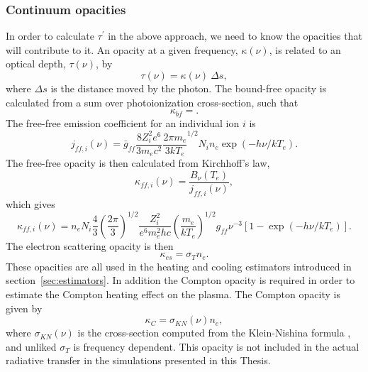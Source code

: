 \subsubsection{Continuum opacities}

In order to calculate $\tau^\prime$ in the above approach, we need
to know the opacities that will contribute to it. An opacity 
at a given frequency, $\kappa(\nu)$,
is related to an optical depth, $\tau(\nu)$, by
\begin{equation}
\tau(\nu) = \kappa(\nu)~\Delta s,
\end{equation}
where $\Delta s$ is the distance moved by the photon. The bound-free
opacity is calculated from a sum over photoionization cross-section,
such that
\begin{equation}
\kappa_{bf} = .
\end{equation}
The free-free emission coefficient for an individual ion $i$ is \citep{gayet1970}
\begin{equation}
j_{ff,i} (\nu) = \bar{g}_{ff}\frac{8Z_i^2e^6}{3m_e c^2}
\frac{2\pi m_e}{3 k T_e}^{1/2}
N_i n_e \exp(-h\nu/kT_e).
\label{eq:jff} 
\end{equation}
The free-free opacity is then calculated from Kirchhoff's law, 
\begin{equation}
\kappa_{ff, i}(\nu) = \frac{B_\nu (T_e)}{j_{ff,i} (\nu)},
\end{equation}
which gives
\begin{equation}
\kappa_{ff, i}(\nu) = n_e N_i \frac{4}{3} \left(\frac{2\pi}{3}\right)^{1/2} 
\frac{Z_i^2}{e^6 m_e^2 hc} \left(\frac{m_e}{kT_e}\right)^{1/2} 
g_{ff} \nu^{-3} [1 - \exp(-h\nu/kT_e)].
\end{equation}
The electron scattering opacity is then 
\begin{equation}
\kappa_{es} = \sigma_T n_e.
\end{equation}
These opacities are all used in the heating and cooling estimators 
introduced in section~\ref{sec:estimators}. In addition the
Compton opacity is required in order to estimate the Compton heating effect on the plasma.
The Compton opacity is given by
\begin{equation}
\kappa_{C} = \sigma_{KN} (\nu) n_e,
\end{equation}
where $\sigma_{KN} (\nu)$ is the cross-section computed 
from the Klein-Nishina formula \citep{klein-nishina}, and unliked $\sigma_T$
is frequency dependent. This opacity is not included in the actual radiative transfer 
in the simulations presented in this Thesis.

